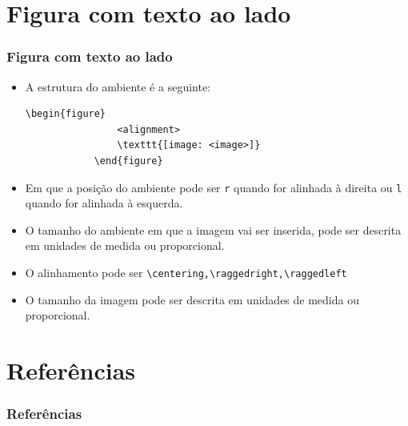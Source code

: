 \documentclass{beamer}
\begin{document}
\section{Figura com texto ao lado}
\begin{frame}[fragile]
    \frametitle{Figura com texto ao lado}

    \begin{itemize}
        \item A estrutura do ambiente é a seguinte:
              \begin{lstlisting}[style=myStyleLatex]
            \begin{figure}
                <alignment>
                \texttt{[image: <image>]}
            \end{figure}
        \end{lstlisting}
        \item Em que a posição do ambiente pode ser \texttt{r} quando for alinhada à direita ou \texttt{l} quando for alinhada à esquerda.
        \item O tamanho do ambiente em que a imagem vai ser inserida, pode ser descrita em unidades de medida ou proporcional.
        \item O alinhamento pode ser \lstinline[style=myStyleLatex]!\centering,\raggedright,\raggedleft!
        \item O tamanho da imagem pode ser descrita em unidades de medida ou proporcional.
    \end{itemize}

\end{frame}

\section{Referências}
\begin{frame}[allowframebreaks]
    \frametitle{Referências}
    \nocite{*}
    \printbibliography[keyword={inserirImagem}]
\end{frame}
\end{document}
